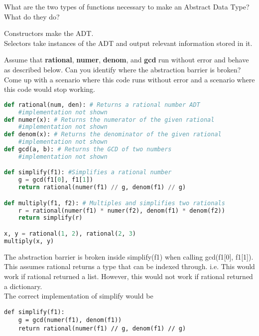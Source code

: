 
\question
What are the two types of functions necessary to make an Abstract Data Type? What do they do?

\begin{solution}[0.25in]
Constructors make the ADT.\\
Selectors take instances of the ADT and output relevant information stored in it.
\end{solution}

\question
Assume that \textbf{rational}, \textbf{numer}, \textbf{denom}, and \textbf{gcd} run without error and behave as described below. Can you identify where the abstraction barrier is broken? Come up with a scenario where this code runs without error and a scenario where this code would stop working.

\begin{lstlisting}[language=Python]
def rational(num, den): # Returns a rational number ADT
    #implementation not shown
def numer(x): # Returns the numerator of the given rational
    #implementation not shown
def denom(x): # Returns the denominator of the given rational
    #implementation not shown
def gcd(a, b): # Returns the GCD of two numbers
    #implementation not shown

def simplify(f1): #Simplifies a rational number
    g = gcd(f1[0], f1[1])
    return rational(numer(f1) // g, denom(f1) // g)

def multiply(f1, f2): # Multiples and simplifies two rationals
    r = rational(numer(f1) * numer(f2), denom(f1) * denom(f2))
    return simplify(r)

x, y = rational(1, 2), rational(2, 3)
multiply(x, y)
\end{lstlisting}

\begin{solution}
The abstraction barrier is broken inside simplify(f1) when calling gcd(f1[0], f1[1]). This assumes rational returns a type that can be indexed through. i.e. This would work if rational returned a list. However, this would not work if rational returned a dictionary.\\

The correct implementation of simplify would be\\
\begin{verbatim}
def simplify(f1): 
    g = gcd(numer(f1), denom(f1))
    return rational(numer(f1) // g, denom(f1) // g)
\end{verbatim}
\end{solution}

